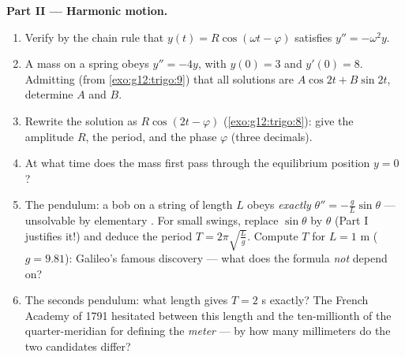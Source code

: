 \begin{problem}
\medskip
\noindent\textbf{Part II --- Harmonic motion.}
\begin{enumerate}[resume]
  \item Verify by the chain rule that
        $y(t) = R\cos(\omega t - \varphi)$ satisfies
        $y'' = -\omega^2 y$.
  \item A mass on a spring obeys $y'' = -4y$, with
        $y(0) = 3$ and $y'(0) = 8$. Admitting (from
        \cref{exo:g12:trigo:9}) that all solutions are
        $A\cos 2t + B\sin 2t$, determine $A$ and $B$.
  \item Rewrite the solution as $R\cos(2t - \varphi)$
        (\cref{exo:g12:trigo:8}): give the amplitude $R$, the
        period, and the phase $\varphi$ (three decimals).
  \item At what time does the mass first pass through the
        equilibrium position $y = 0$?
  \item The pendulum: a bob on a string of length $L$ obeys
        \emph{exactly} $\theta'' = -\frac gL \sin\theta$ ---
        unsolvable by elementary . For small swings,
        replace $\sin\theta$ by $\theta$ (Part I justifies it!)
        and deduce the period
        $T = 2\pi\sqrt{\frac Lg}$. Compute $T$ for
        $L = 1$ m ($g = 9.81$): Galileo's famous discovery ---
        what does the formula \emph{not} depend on?
  \item The seconds pendulum: what length gives
        $T = 2$ s exactly? The French Academy of 1791 hesitated
        between this length and the ten-millionth of the
        quarter-meridian for defining the \emph{meter} --- by
        how many millimeters do the two candidates differ?
\end{enumerate}


\end{problem}
